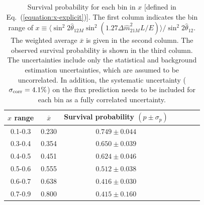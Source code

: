 \documentclass[aps,prc,twocolumn,groupedaddress,showpacs,amsmath,amssymb,floatfix,superscriptaddress]{revtex4}
\begin{document}
 \begin{center}
 \begin{table}[h]
 \vspace{-1.0cm}
 \caption{\label{table:P_LE} Survival probability for each bin in $x$ [defined in 
\mbox{Eq.~(\ref{equation:x-explicit})}]. 
The first column indicates the bin range of \mbox{$x \equiv \langle \sin^{2}2\hat{\theta}_{12M}\sin^{2}(1.27 \Delta \hat{m}_{21M}^{2} L / E) \rangle /\sin^{2}2{\hat{\theta}_{12}}$}. The weighted average $\overline{x}$ is given in the second column. The observed survival probability is shown in the third column. 
The uncertainties include only the statistical and background estimation uncertainties, which are assumed to be uncorrelated. In addition, the systematic uncertainty \mbox{($\sigma_{\rm corr} = 4.1\%$)} on the flux prediction needs to be included for each bin as a fully correlated uncertainty.}
\centering
\begin{tabular}{@{}*{7}{c}}
\hline
\hline
\hspace{0.5cm} $x$ range \hspace{0.5cm} & \hspace{0.3cm} $\overline{x}$ \hspace{0.3cm} &  \hspace{0.5cm} Survival probability $(p \pm \sigma_{p})$ \hspace{0.5cm} & \\
\hline
0.1-0.3 &0.230 & $0.749 \pm 0.044$\\
0.3-0.4 &0.354 & $0.650 \pm 0.039$\\
0.4-0.5 &0.451 & $0.624 \pm 0.046$\\
0.5-0.6 &0.555 & $0.512 \pm 0.038$\\
0.6-0.7 &0.638 & $0.416 \pm 0.030$\\
0.7-0.9 &0.800 & $0.415 \pm 0.160$\\
\hline
\hline
\end{tabular}
\end{table}
\end{center}
  
 
 
\end{document}

